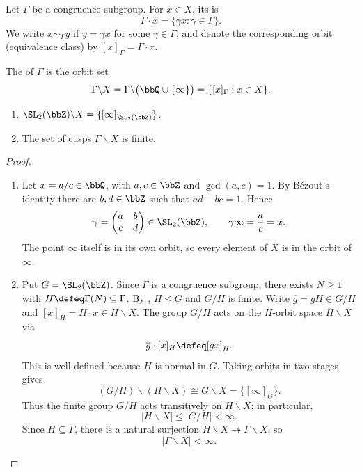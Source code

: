 Let $\Gamma$ be a congruence subgroup. For $x \in X$, its  is
\[
    \Gamma \cdot x = \{\gamma x : \gamma \in \Gamma\}.
\]
We write $x \sim _{\Gamma}y$ if $y = \gamma x$ for some $\gamma \in \Gamma$, and denote the corresponding orbit (equivalence class) by $[x]_{\Gamma} = \Gamma \cdot x$.

\begin{definition}\label{Def:MF_cusps}
    The  of $\Gamma$ is the orbit set
    \[
        \Gamma \backslash X
        = \Gamma \backslash \bigl(\bbQ \cup \{\infty\}\bigr)
        = \{[x]_{\Gamma} : x \in X\}.
    \]
\end{definition}

\begin{lemma}\label{Lem:MF_cusps}
    \leavevmode
    \begin{enumerate}[label=(\roman*)]
        \item $\SL_2(\bbZ) \backslash X = \{[\infty]_{\SL_2(\bbZ)}\}$.
        \item The set of cusps $\Gamma \backslash X$ is finite.
    \end{enumerate}
\end{lemma}
\begin{proof}
    \leavevmode
    \begin{enumerate}[label=(\roman*)]
        \item Let $x = a/c \in \bbQ$, with $a, c \in \bbZ$ and $\gcd(a, c) = 1$. By B\'ezout's identity there are $b, d \in \bbZ$ such that $ad - bc = 1$. Hence
        \[
            \gamma = \begin{pmatrix}a & b\\ c & d\end{pmatrix}
            \in \SL_2(\bbZ), \qquad \gamma\infty = \frac ac = x.
        \]
        The point $\infty$ itself is in its own orbit, so every element of $X$ is in the orbit of $\infty$.

        \item Put $G = \SL_2(\bbZ)$. Since $\Gamma$ is a
        congruence subgroup, there exists $N \ge 1$ with $H \defeq \Gamma(N) \subseteq \Gamma$. By , $H \trianglelefteq G$ and $G/H$ is finite. Write $\overline{g} = gH \in G/H$ and $[x]_H = H \cdot x \in H \backslash X$. The group $G/H$ acts on the $H$-orbit space $H \backslash X$ via
        \[
            \overline{g} \cdot [x]_H \defeq [gx]_H.
        \]
        This is well-defined because $H$ is normal in $G$. Taking orbits in two stages gives
        \[
            (G/H) \backslash (H \backslash X) \cong G \backslash X
            = \{[\infty]_G\}.
        \]
        Thus the finite group $G/H$ acts transitively on $H \backslash X$; in particular,
        \[
            |H \backslash X| \le |G/H| < \infty.
        \]
        Since $H \subseteq \Gamma$, there is a natural surjection $H \backslash X \twoheadrightarrow \Gamma \backslash X$, so
        \[
            |\Gamma \backslash X| < \infty.
        \]
    \end{enumerate}
\end{proof}

